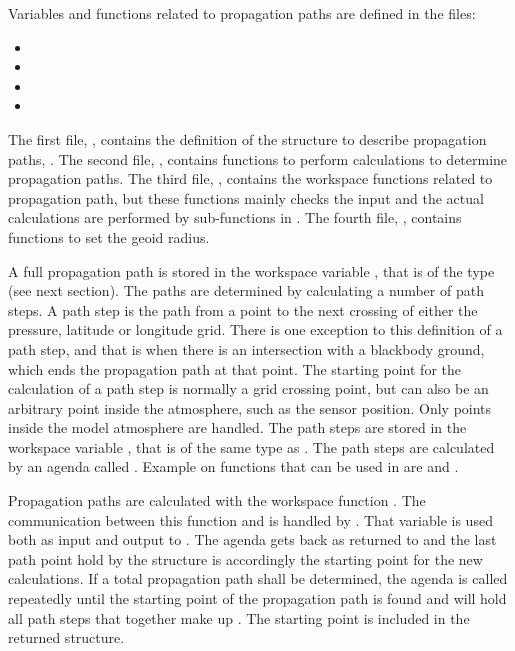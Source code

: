 Variables and functions related to propagation paths are defined in the files:
\begin{itemize}
\item {}
\item {}
\item {}
\item {}
\end{itemize}
The first file, , contains the definition of the
structure to describe propagation paths, . The
second file, , contains functions to perform
calculations to determine propagation paths. The third file,
, contains the workspace functions related to
propagation path, but these functions mainly checks the input and the
actual calculations are performed by sub-functions in
. The fourth file, ,
contains functions to set the geoid radius.




\label{sec:ppath:approach}

A full propagation path is stored in the workspace variable
, that is of the type  (see next
section). The paths are determined by calculating a number of path
steps. A path step is the path from a point to the next crossing
of either the pressure, latitude or longitude grid. There is one
exception to this definition of a path step, and that is when there
is an intersection with a blackbody ground, which ends the propagation
path at that point. The starting point for the calculation of a path
step is normally a grid crossing point, but can also be an arbitrary
point inside the atmosphere, such as the sensor position. Only points
inside the model atmosphere are handled. The path steps are stored in
the workspace variable , that is of the same
type as . The path steps are calculated by an agenda
called . Example on functions that can
be used in  are
 and
.

Propagation paths are calculated with the workspace function
. The communication between this function and
 is handled by .
That variable is used both as input and output to
.  The agenda gets back
 as returned to  and the
last path point hold by the structure is accordingly the starting
point for the new calculations. If a total propagation path shall be
determined, the agenda is called repeatedly until the starting point
of the propagation path is found and  will hold
all path steps that together make up . The starting
point is included in the returned structure.

